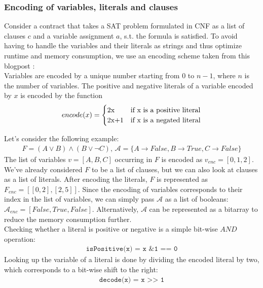 \documentclass{article}
\begin{document}
\subsubsection{Encoding of variables, literals and clauses}
Consider a contract that takes a SAT problem formulated in CNF as a list of clauses $c$ and a variable assignment $a$, s.t. the formula is satisfied. To avoid having to handle the variables and their literals as strings and thus optimize runtime and memory consumption, we use an encoding scheme taken from this blogpost \cite{sabablog}: \\
Variables are encoded by a unique number starting from $0$ to $n-1$, where $n$ is the number of variables. The positive and negative literals of a variable encoded by $x$ is encoded by the function
\begin{align*}
encode(x) =
\begin{cases}
  $2x$  & \text{if x is a positive literal}\\
  $2x+1$ & \text{if x is a negated literal}\\
\end{cases}   
\end{align*}

Let's consider the following example:
\begin{align*}
F = (A \vee B) \wedge (B \vee \neg C) \text{, } \mathcal{A} = \{A \rightarrow False, B \rightarrow True, C \rightarrow False\}
\end{align*}
The list of variables $v=[A,B,C]$ occurring in $F$ is encoded as $v_{enc} = [0,1,2]$. We've already considered $F$ to be a list of clauses, but we can also look at clauses as a list of literals. After encoding the literals, $F$ is represented as $F_{enc} = [[0,2],[2,5]]$. Since the encoding of variables corresponds to their index in the list of variables, we can simply pass $\mathcal{A}$ as a list of booleans: $\mathcal{A}_{enc} = [False, True, False]$. Alternatively, $\mathcal{A}$ can be represented as a bitarray to reduce the memory consumption further. \\
Checking whether a literal is positive or negative is a simple bit-wise $AND$ operation:
\begin{align*}
\texttt{isPositive(x) = x \& 1 == 0}
\end{align*}
Looking up the variable of a literal is done by dividing the encoded literal by two, which corresponds to a bit-wise shift to the right:
\begin{align*}
\texttt{decode(x) = x >> 1}
\end{align*}
\end{document}
